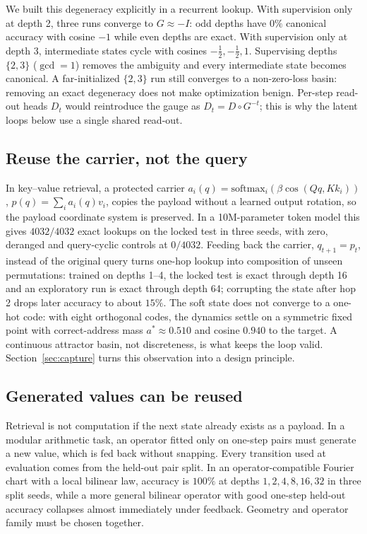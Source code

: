 \documentclass[11pt]{article}
\theoremstyle{definition}
\theoremstyle{remark}
\begin{document}
We built this degeneracy explicitly in a recurrent lookup. With supervision only at depth 2,
three runs converge to $G\approx-I$: odd depths have $0\%$ canonical accuracy with cosine $-1$
while even depths are exact. With supervision only at depth 3, intermediate states cycle with
cosines $-\tfrac12,-\tfrac12,1$. Supervising depths $\{2,3\}$ ($\gcd=1$) removes the ambiguity
and every intermediate state becomes canonical. A far-initialized $\{2,3\}$ run still converges
to a non-zero-loss basin: removing an exact degeneracy does not make optimization benign. Per-step
read-out heads $D_t$ would reintroduce the gauge as $D_t=D\circ G^{-t}$; this is why the latent
loops below use a single shared read-out.

\subsection{Reuse the carrier, not the query}

In key--value retrieval, a protected carrier $a_i(q)=\mathrm{softmax}_i(\beta\cos(Qq,Kk_i))$,
$p(q)=\sum_ia_i(q)v_i$, copies the payload without a learned output rotation, so the payload
coordinate system is preserved. In a 10M-parameter token model this gives $4032/4032$ exact
lookups on the locked test in three seeds, with zero, deranged and query-cyclic controls at
$0/4032$. Feeding back the carrier, $q_{t+1}=p_t$, instead of the original query turns one-hop
lookup into composition of unseen permutations: trained on depths 1--4, the locked test is exact
through depth 16 and an exploratory run is exact through depth 64; corrupting the state after
hop 2 drops later accuracy to about $15\%$. The soft state does not converge to a one-hot code:
with eight orthogonal codes, the dynamics settle on a symmetric fixed point with correct-address
mass $a^*\approx0.510$ and cosine $0.940$ to the target. A continuous attractor basin, not
discreteness, is what keeps the loop valid. Section~\ref{sec:capture} turns this observation into a
design principle.

\subsection{Generated values can be reused}

Retrieval is not computation if the next state already exists as a payload. In a modular
arithmetic task, an operator fitted only on one-step pairs must generate a new value, which is
fed back without snapping. Every transition used at evaluation comes from the held-out pair
split. In an operator-compatible Fourier chart with a local bilinear law, accuracy is $100\%$ at
depths $1,2,4,8,16,32$ in three split seeds, while a more general bilinear operator with good
one-step held-out accuracy collapses almost immediately under feedback. Geometry and operator
family must be chosen together.
\end{document}
